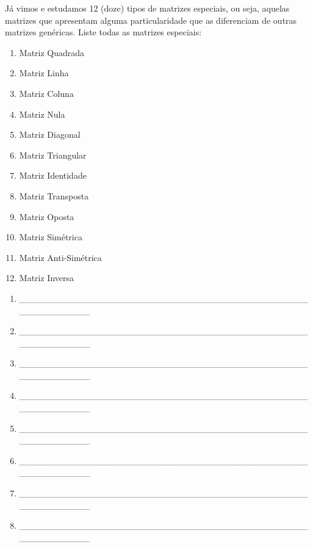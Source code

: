 \documentclass[pdftex, brazil, 12pt, oneside, addpoints]{exam}
\begin{document}
\begin{questions}
\question
Já vimos e estudamos 12 (doze) tipos de matrizes especiais, ou seja, aquelas matrizes
que apresentam alguma particularidade que as diferenciam de outras matrizes genéricas.
Liste todas as matrizes especiais:
\ifprintanswers
\begin{solution}
  \vspace{-0.7cm}
\begin{enumerate}
  \item Matriz Quadrada
  \item Matriz Linha
  \item Matriz Coluna
  \item Matriz Nula
  \item Matriz Diagonal
  \item Matriz Triangular
  \item Matriz Identidade
  \item Matriz Transposta
  \item Matriz Oposta
  \item Matriz Simétrica
  \item Matriz Anti-Simétrica
  \item Matriz Inversa
\end{enumerate}
\end{solution}
\else
\begin{enumerate}
  \item \_\_\_\_\_\_\_\_\_\_\_\_\_\_\_\_\_\_\_\_\_\_\_\_\_\_\_\_\_\_\_\_\_\_\_\_\_\_\_\_\_\_\_\_\_\_\_\_\_\_\_\_\_\_\_\_
  \item \_\_\_\_\_\_\_\_\_\_\_\_\_\_\_\_\_\_\_\_\_\_\_\_\_\_\_\_\_\_\_\_\_\_\_\_\_\_\_\_\_\_\_\_\_\_\_\_\_\_\_\_\_\_\_\_
  \item \_\_\_\_\_\_\_\_\_\_\_\_\_\_\_\_\_\_\_\_\_\_\_\_\_\_\_\_\_\_\_\_\_\_\_\_\_\_\_\_\_\_\_\_\_\_\_\_\_\_\_\_\_\_\_\_
  \item \_\_\_\_\_\_\_\_\_\_\_\_\_\_\_\_\_\_\_\_\_\_\_\_\_\_\_\_\_\_\_\_\_\_\_\_\_\_\_\_\_\_\_\_\_\_\_\_\_\_\_\_\_\_\_\_
  \item \_\_\_\_\_\_\_\_\_\_\_\_\_\_\_\_\_\_\_\_\_\_\_\_\_\_\_\_\_\_\_\_\_\_\_\_\_\_\_\_\_\_\_\_\_\_\_\_\_\_\_\_\_\_\_\_
  \item \_\_\_\_\_\_\_\_\_\_\_\_\_\_\_\_\_\_\_\_\_\_\_\_\_\_\_\_\_\_\_\_\_\_\_\_\_\_\_\_\_\_\_\_\_\_\_\_\_\_\_\_\_\_\_\_
  \item \_\_\_\_\_\_\_\_\_\_\_\_\_\_\_\_\_\_\_\_\_\_\_\_\_\_\_\_\_\_\_\_\_\_\_\_\_\_\_\_\_\_\_\_\_\_\_\_\_\_\_\_\_\_\_\_
  \item \_\_\_\_\_\_\_\_\_\_\_\_\_\_\_\_\_\_\_\_\_\_\_\_\_\_\_\_\_\_\_\_\_\_\_\_\_\_\_\_\_\_\_\_\_\_\_\_\_\_\_\_\_\_\_\_

\end{enumerate}
\end{questions}
\end{document}
